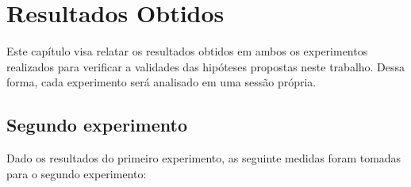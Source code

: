 \chapter[Resultados Obtidos]{Resultados Obtidos}

Este capítulo visa relatar os resultados obtidos em ambos os experimentos
realizados para verificar a validades das hipóteses propostas neste trabalho.
Dessa forma, cada experimento será analisado em uma sessão própria.

\section{Segundo experimento}

Dado os resultados do primeiro experimento, as seguinte medidas foram tomadas
para o segundo experimento:

